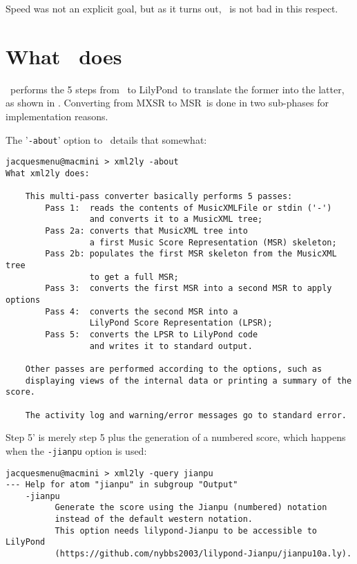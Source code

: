 Speed was not an explicit goal, but as it turns out, \xmlToLy\ is not bad in this respect.


\section{What \xmlToLy\ does}

\xmlToLy\ performs the 5 steps from \mxml\ to LilyPond\ to translate the former into the latter, as shown in . Converting from MXSR to MSR\ is done in two sub-phases for implementation reasons.

The '{\tt -about}' option to \xmlToLy\ details that somewhat:
\begin{lstlisting}[language=MusicXML]
jacquesmenu@macmini > xml2ly -about
What xml2ly does:

    This multi-pass converter basically performs 5 passes:
        Pass 1:  reads the contents of MusicXMLFile or stdin ('-')
                 and converts it to a MusicXML tree;
        Pass 2a: converts that MusicXML tree into
                 a first Music Score Representation (MSR) skeleton;
        Pass 2b: populates the first MSR skeleton from the MusicXML tree
                 to get a full MSR;
        Pass 3:  converts the first MSR into a second MSR to apply options
        Pass 4:  converts the second MSR into a
                 LilyPond Score Representation (LPSR);
        Pass 5:  converts the LPSR to LilyPond code
                 and writes it to standard output.

    Other passes are performed according to the options, such as
    displaying views of the internal data or printing a summary of the score.

    The activity log and warning/error messages go to standard error.
\end{lstlisting}

Step 5' is merely step 5 plus the generation of a numbered score, which happens when the {\tt -jianpu} option is used:
\begin{lstlisting}[language=Terminal]
jacquesmenu@macmini > xml2ly -query jianpu
--- Help for atom "jianpu" in subgroup "Output"
    -jianpu
          Generate the score using the Jianpu (numbered) notation
          instead of the default western notation.
          This option needs lilypond-Jianpu to be accessible to LilyPond
          (https://github.com/nybbs2003/lilypond-Jianpu/jianpu10a.ly).
\end{lstlisting}
